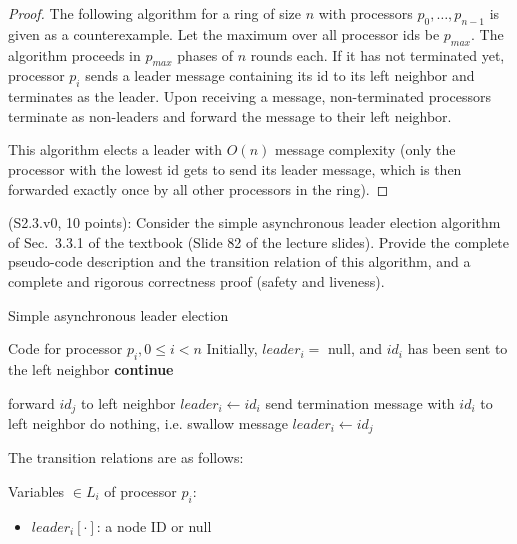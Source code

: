 \begin{proof}
The following algorithm for a ring of size $n$ with processors $p_0, \ldots, p_{n-1}$
is given as a counterexample. Let the maximum over all processor ids be $p_{max}$.
The algorithm proceeds in $p_{max}$ phases of $n$ rounds each.
If it has not terminated yet, processor $p_i$ sends a leader message containing its id
to its left neighbor and terminates as the leader. Upon receiving a message, non-terminated processors
terminate as non-leaders and forward the message to their left neighbor.

This algorithm elects a leader with $O(n)$ message complexity (only the processor with the lowest
id gets to send its leader message, which is then forwarded exactly once by all other processors in
the ring).
\end{proof}


\begin{Exc}{(S2.3.v0, 10 points):}
Consider the simple asynchronous leader election algorithm of Sec.~3.3.1 of
the textbook (Slide 82 of the lecture slides). Provide the complete
pseudo-code description and the transition relation of this algorithm,
and a complete and rigorous correctness proof (safety and liveness).
\end{Exc}

\begin{algorithm}
\caption{Simple asynchronous leader election} \label{alg:ale}
\begin{algorithmic}[1]
\Statex Code for processor $p_i, 0 \leq i < n$
\Statex Initially, $leader_i = $ null, and $id_i$ has been sent to the left neighbor
        \State \textbf{continue}
    \EndIf

        \State forward $id_j$ to left neighbor
        \State $leader_i \gets id_i$
        \State send termination message with $id_i$ to left neighbor
        \State do nothing, i.e. swallow message
        \State $leader_i \gets id_j$
    \EndIf
\EndFor
\end{algorithmic}
\end{algorithm}

The transition relations are as follows:

Variables $\in L_i$ of processor $p_i$:
\begin{itemize}
\item $leader_i[\cdot]$: a node ID or null
\end{itemize}


